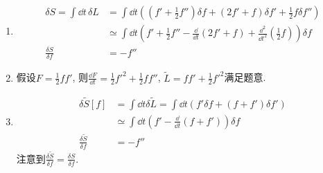 \begin{solution}
    \begin{enumerate}[label=(\arabic*)]
        \item     \[
            \begin{aligned}
                \delta S = \int \dd t\,\delta L &= \int \dd t \left(\left(f' + \frac{1}{2}f''\right)\delta f + \left(2f' + f\right)\delta f' + \frac{1}{2}f \delta f''\right)\\
                &\simeq \int \dd t \left(f' + \frac{1}{2}f'' - \frac{\dd}{\dd t}\left(2f'+f\right)+\frac{\dd^2}{\dd t^2}\left(\frac{1}{2}f\right)\right) \delta f \\
                \frac{\delta S}{\delta f} &= - f''
            \end{aligned}
            \]
        \item 假设\(F = \frac{1}{2}f f'\), 则\(\frac{\dd F}{\dd t} = \frac{1}{2}f'^2 + \frac{1}{2} f f''\), \(\tilde{L} = f f' + \frac{1}{2}f'^2\)满足题意.
        \item \[
        \begin{aligned}
            \delta \tilde{S}[f] &= \int \dd t \delta \tilde{L} = \int \dd t \left(f' \delta f + (f + f') \delta f'\right) \\
            &\simeq \int \dd t \left(f' - \frac{\dd}{\dd t} (f + f')\right)\delta f \\
            \frac{\delta \tilde{S}}{\delta f} &= - f''
        \end{aligned}
        \]
        注意到\(\frac{\delta \tilde{S}}{\delta f} = \frac{\delta S}{\delta f}\). 
    \end{enumerate}
\end{solution}



